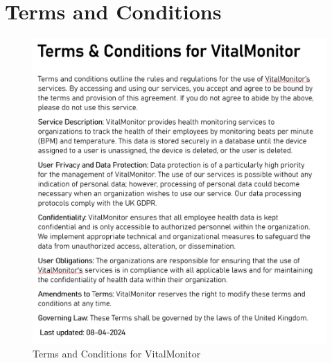 \chapter{Terms and Conditions}
\label{app:tnc}

\begin{figure}[h!]
    \centering
    \includegraphics[width=0.8\linewidth]{images/tnc.png}
    \caption{Terms and Conditions for VitalMonitor}
    \label{fig:tnc}
\end{figure}